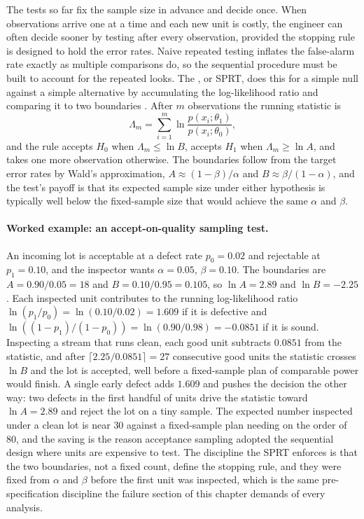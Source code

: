 The tests so far fix the sample size in advance and decide once. When
observations arrive one at a time and each new unit is costly, the
engineer can often decide sooner by testing after every observation,
provided the stopping rule is designed to hold the error rates. Naive
repeated testing inflates the false-alarm rate exactly as
multiple comparisons do, so the sequential procedure must be built to
account for the repeated looks. The , or SPRT, does this for a simple null against a simple
alternative by accumulating the log-likelihood ratio and comparing it
to two boundaries \cite[ch.~10]{text:wasserman2004}. After $m$
observations the running statistic is
\[
\Lambda_{m} = \sum_{i=1}^{m} \ln\frac{p(x_{i}; \theta_{1})}
{p(x_{i}; \theta_{0})},
\]
and the rule accepts $H_{0}$ when $\Lambda_{m} \leq \ln B$, accepts
$H_{1}$ when $\Lambda_{m} \geq \ln A$, and takes one more observation
otherwise. The boundaries follow from the target error rates by Wald's
approximation, $A \approx (1-\beta)/\alpha$ and $B \approx \beta/
(1-\alpha)$, and the test's payoff is that its expected sample size
under either hypothesis is typically well below the fixed-sample size
that would achieve the same $\alpha$ and $\beta$.

\paragraph{Worked example: an accept-on-quality sampling test.} An
incoming lot is acceptable at a defect rate $p_{0} = 0.02$ and
rejectable at $p_{1} = 0.10$, and the inspector wants $\alpha = 0.05$,
$\beta = 0.10$. The boundaries are $A = 0.90/0.05 = 18$ and
$B = 0.10/0.95 = 0.105$, so $\ln A = 2.89$ and $\ln B = -2.25$. Each
inspected unit contributes to the running log-likelihood ratio $\ln
(p_{1}/p_{0}) = \ln(0.10/0.02) = 1.609$ if it is defective and
$\ln((1 - p_{1})/(1 - p_{0})) = \ln(0.90/0.98) = -0.0851$ if it is
sound. Inspecting a stream that runs clean, each good unit subtracts
$0.0851$ from the statistic, and after $\lceil 2.25/0.0851 \rceil = 27$
consecutive good units the statistic crosses $\ln B$ and the lot is
accepted, well before a fixed-sample plan of comparable power would
finish. A single early defect adds $1.609$ and pushes the decision the
other way: two defects in the first handful of units drive the
statistic toward $\ln A = 2.89$ and reject the lot on a tiny sample.
The expected number inspected under a clean lot is near $30$ against
a fixed-sample plan needing on the order of $80$, and the saving is the
reason acceptance sampling adopted the sequential design where units
are expensive to test. The discipline the SPRT enforces is that the
two boundaries, not a fixed count, define the stopping rule, and they
were fixed from $\alpha$ and $\beta$ before the first unit was
inspected, which is the same pre-specification discipline the failure
section of this chapter demands of every analysis.

